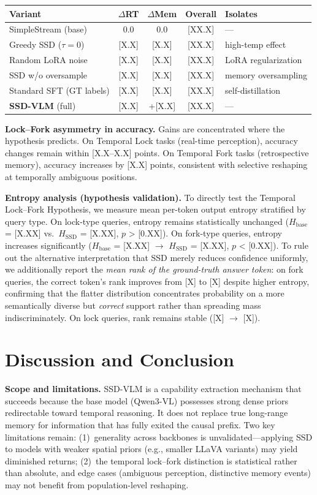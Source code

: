 \documentclass[11pt,a4paper]{article}
\begin{document}
\begin{center}
\small
\begin{tabular}{lcccl}
\toprule
Variant & $\Delta$RT & $\Delta$Mem & Overall & Isolates \\
\midrule
SimpleStream (base) & 0.0 & 0.0 & [XX.X] & --- \\
Greedy SSD ($\tau\!=\!0$) & [X.X] & [X.X] & [XX.X] & high-temp effect \\
Random LoRA noise & [X.X] & [X.X] & [XX.X] & LoRA regularization \\
SSD w/o oversample & [X.X] & [X.X] & [XX.X] & memory oversampling \\
Standard SFT (GT labels) & [X.X] & [X.X] & [XX.X] & self-distillation \\
\textbf{SSD-VLM} (full) & [X.X] & +[X.X] & [XX.X] & --- \\
\bottomrule
\end{tabular}
\end{center}

\textbf{Lock--Fork asymmetry in accuracy.} Gains are concentrated where the hypothesis predicts. On Temporal Lock tasks (real-time perception), accuracy changes remain within [X.X--X.X] points. On Temporal Fork tasks (retrospective memory), accuracy increases by [X.X] points, consistent with selective reshaping at temporally ambiguous positions.

\textbf{Entropy analysis (hypothesis validation).} To directly test the Temporal Lock--Fork Hypothesis, we measure mean per-token output entropy stratified by query type. On lock-type queries, entropy remains statistically unchanged ($H_\text{base}$ = [X.XX] vs.\ $H_\text{SSD}$ = [X.XX], $p$ > [0.XX]). On fork-type queries, entropy increases significantly ($H_\text{base}$ = [X.XX] $\rightarrow$ $H_\text{SSD}$ = [X.XX], $p$ < [0.XX]). To rule out the alternative interpretation that SSD merely reduces confidence uniformly, we additionally report the \textit{mean rank of the ground-truth answer token}: on fork queries, the correct token's rank improves from [X] to [X] despite higher entropy, confirming that the flatter distribution concentrates probability on a more semantically diverse but \textit{correct} support rather than spreading mass indiscriminately. On lock queries, rank remains stable ([X] $\rightarrow$ [X]).

\section{Discussion and Conclusion}
\textbf{Scope and limitations.} SSD-VLM is a capability extraction mechanism that succeeds because the base model (Qwen3-VL) possesses strong dense priors redirectable toward temporal reasoning. It does not replace true long-range memory for information that has fully exited the causal prefix. Two key limitations remain: (1)~generality across backbones is unvalidated---applying SSD to models with weaker spatial priors (e.g., smaller LLaVA variants) may yield diminished returns; (2)~the temporal lock--fork distinction is statistical rather than absolute, and edge cases (ambiguous perception, distinctive memory events) may not benefit from population-level reshaping.
\end{document}
